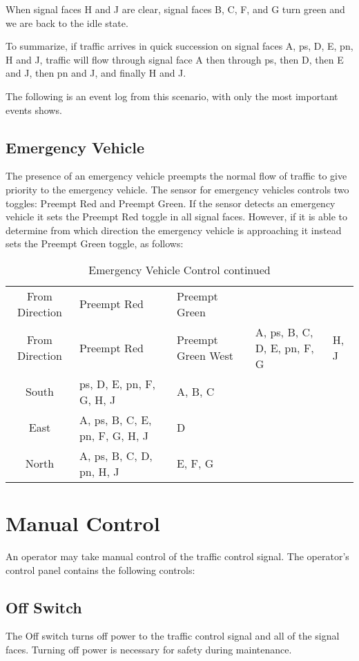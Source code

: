 \documentclass[letterpaper,twoside]{article}
\begin{document}
When signal faces H and J are clear, signal faces B, C, F, and G
turn green and we are back to the idle state.

To summarize, if traffic arrives in quick succession on signal faces
A, ps, D, E, pn, H and J, traffic will flow through signal face
A then through ps, then D, then E and J, then pn and J, and finally H
and J.

The following is an event log from this scenario, with only the most
important events shows.



\subsection{Emergency Vehicle}

The presence of an emergency vehicle preempts the normal flow of traffic
to give priority to the emergency vehicle. The sensor for emergency
vehicles controls two toggles: Preempt Red and Preempt Green.
If the sensor detects an emergency
vehicle it sets the Preempt Red toggle in all signal faces.
However, if it is able to determine from which direction the emergency vehicle
is approaching it instead sets the Preempt Green toggle, as follows:

\begin{longtable}{c | l | l}
  \caption{Emergency Vehicle control} \\
  From Direction & Preempt Red & Preempt Green \endfirsthead
  \caption{Emergency Vehicle Control continued} \\
  From Direction & Preempt Red & Preempt Green \endhead
  \hline West & A, ps, B, C, D, E, pn, F, G & H, J \\
  \hline South & ps, D, E, pn, F, G, H, J & A, B, C \\
  \hline East & A, ps, B, C, E, pn, F, G, H, J & D \\
  \hline North & A, ps, B, C, D, pn, H, J & E, F, G \\
\end{longtable}

\section{Manual Control}

An operator may take manual control of the traffic control signal.
The operator's control panel contains the following controls:

\subsection{Off Switch}
The Off switch turns off power to the traffic control signal and all
of the signal faces.  Turning off power is necessary for safety during
maintenance.
\end{document}
